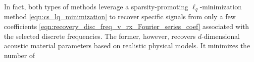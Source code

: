 In fact,
both types of
methods leverage
a sparsity-promoting $\ell_{q}$-minimization method
\eqref{eqn:cs_lq_minimization} to recover
specific signals from
only a few  coefficients
\eqref{eqn:recovery_disc_freq_v_rx_Fourier_series_coef} associated with
the selected discrete frequencies.
The former, however, recovers
$d$-dimensional acoustic material parameters based on
realistic physical models.
It minimizes
the number of

